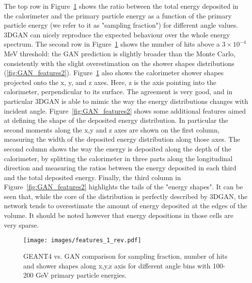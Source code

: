 The top row in Figure~\ref{fig:GAN_features1} shows the ratio between the total energy deposited in the calorimeter and the primary particle energy as a function of the primary particle energy (we refer to it as "sampling fraction") for different angle values. 3DGAN can nicely reproduce the expected behaviour over the whole energy spectrum. The second row in Figure~\ref{fig:GAN_features1} shows the number of hits above a $3 \times 10^{-4}$ MeV threshold: the GAN prediction is slightly broader than the Monte Carlo, consistently with the slight overestimation on the shower shapes distributions (\ref{fig:GAN_features2}).  Figure~\ref{fig:GAN_features1} also shows the calorimeter shower shapes projected onto the x, y, and z axes. Here, z is the axis pointing into the calorimeter, perpendicular to its surface. The agreement is very good, and in particular 3DGAN is able to mimic the way the energy distributions changes with incident angle. 
Figure~\ref{fig:GAN_features2} shows some additional features aimed at defining the shape of the deposited energy distribution. In particular the second moments along the x,y and z axes are shown on the first column, measuring the width of the deposited energy distribution along those axes. The second column shows the way the energy is deposited along the depth of the calorimeter, by splitting the calorimeter in three parts along the longitudinal direction and measuring the ratios between the energy deposited in each third  and the total deposited energy. Finally, the third column in Figure~\ref{fig:GAN_features2} highlights the tails of the "energy shapes". It can be seen that, while the core of the distribution is perfectly described by 3DGAN, the network tends to overestimate the amount of energy deposited at the edges of the volume. It should be noted however that energy depositions in those cells are very sparse. 
\iffalse
\begin{figure}
    \centering
    \texttt{[image: images/GAN\_feature\_ECAL\_E.png]}
    \texttt{[image: images/GAN\_feature\_ECAL\_nHits.png]}
    \texttt{[image: images/GAN\_feature\_ECAL\_ratioFirstLayerToSecondLayerE.png]}
    \texttt{[image: images/GAN\_feature\_ECAL\_ratioFirstLayerToTotalE.png]}
    \texttt{[image: images/GAN\_feature\_ECALmomentX1.png]}
    \texttt{[image: images/GAN\_feature\_ECALmomentX2.png]}
    \texttt{[image: images/GAN\_feature\_ECALmomentX3.png]}
    \texttt{[image: images/GAN\_feature\_ECALmomentY1.png]}
    \texttt{[image: images/GAN\_feature\_ECALmomentZ1.png]}
    \texttt{[image: images/GAN\_feature\_R9.png]}
    \caption{GAN vs. GEANT comparisons for various features. {\bf theta should be $\theta$.}
    \label{fig:GAN_features}}
\end{figure}
\fi
\begin{figure}
    \centering
    \texttt{[image: images/features\_1\_rev.pdf]}
    \caption{GEANT4 vs. GAN comparison for sampling fraction, number
      of hits and shower shapes along x,y,z axis for different angle
      bins with 100-200 GeV primary particle energies.
      \label{fig:GAN_features1}}
\end{figure}

